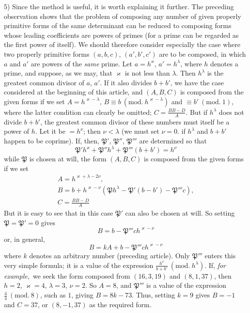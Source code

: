 5) Since the method is useful, it is worth explaining it further. The preceding observation shows that the problem of composing any number of given properly primitive forms of the same determinant can be reduced to composing forms whose leading coefficients are powers of primes (for a prime can be regarded as the first power of itself). We should therefore consider especially the case where two properly primitive forms $(a,b,c)$, $(a',b',c')$ are to be composed, in which $a$ and $a'$ are powers of the \textit{same} prime. Let $a=h^{\varkappa}$, $a'=h^{\lambda}$, where $h$ denotes a prime, and suppose, as we may, that $\varkappa$ is not less than $\lambda$. Then $h^{\lambda}$ is the greatest common divisor of $a$, $a'$. If it also divides $b+b'$, we have the case considered at the beginning of this article, and $(A,B,C)$ is composed from the given forms if we set $A=h^{\varkappa-\lambda}$, $B\equiv b\ (\mathrm{mod.}\ h^{\varkappa-\lambda})$ and $\equiv b'\ (\mathrm{mod.}\ 1)$, where the latter condition can clearly be omitted; $C=\frac{BB-D}{A}$. But if $h^{\lambda}$ does not divide $b+b'$, the greatest common divisor of these numbers must itself be a power of $h$. Let it be $=h^{\nu}$; then $\nu<\lambda$ (we must set $\nu=0$. if $h^{\lambda}$ and $b+b'$ happen to be coprime). If, then, $\mathfrak{P}'$, $\mathfrak{P}''$, $\mathfrak{P}'''$ are determined so that
\[
\mathfrak{P}'h^{\varkappa}+\mathfrak{P}''h^{\lambda}+\mathfrak{P}'''(b+b')=h^{\nu}
\]
while $\mathfrak{P}$ is chosen at will, the form $(A,B,C)$ is composed from the given forms if we set
\[
\begin{gathered}A=h^{\varkappa+\lambda-2\nu},\\
B=b+h^{\varkappa-\nu}(\mathfrak{P}h^{\lambda}-\mathfrak{P}'(b-b')-\mathfrak{P}'''c),\\
C=\frac{BB-D}{A}\end{gathered}
\]
But it is easy to see that in this case $\mathfrak{P}'$ can also be chosen at will. So setting $\mathfrak{P}=\mathfrak{P}'=0$ gives
\[
B=b-\mathfrak{P}'''ch^{\varkappa-\nu}
\]
or, in general,
\[
B=kA+b-\mathfrak{P}'''ch^{\varkappa-\nu}
\]
where $k$ denotes an arbitrary number (preceding article). Only $\mathfrak{P}'''$ enters this very simple formula; it is a value of the expression $\frac{h^{\nu}}{b+b'}\ (\mathrm{mod.}\ h^{\lambda})$. If, \textit{for example,}\ we seek the form composed from $(16,3,19)$ and $(8,1,37)$, then $h=2$, $\varkappa=4$, $\lambda=3$, $\nu=2$.
So $A=8$, and $\mathfrak{P}'''$ is a value of the expression $\frac{4}{4}\ (\mathrm{mod.}\ 8)$, such as $1$, giving $B=8k-73$. Thus, setting $k=9$ gives $B=-1$ and $C=37$, or $(8,-1,37)$ as the required form.

